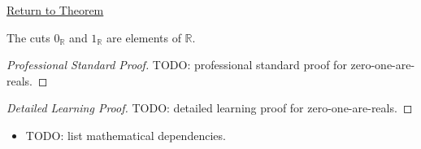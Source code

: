 \newpage
{}
\label{prf:zero-one-are-reals}

\begin{remark*}[Return]
\hyperref[thm:zero-one-are-reals]{Return to Theorem}
\end{remark*}

\begin{theorem*}
The cuts $0_{\mathbb{R}}$ and $1_{\mathbb{R}}$ are elements of $\mathbb{R}$.
\end{theorem*}

\begin{proof}[Professional Standard Proof]
\LRAProofBodyStart
TODO: professional standard proof for zero-one-are-reals.
\end{proof}

\begin{proof}[Detailed Learning Proof]
\LRAProofBodyStart
TODO: detailed learning proof for zero-one-are-reals.
\end{proof}

\begin{remark*}
\end{remark*}

\begin{dependencies}
\begin{itemize}
  \item TODO: list mathematical dependencies.
\end{itemize}
\end{dependencies}

\clearpage
